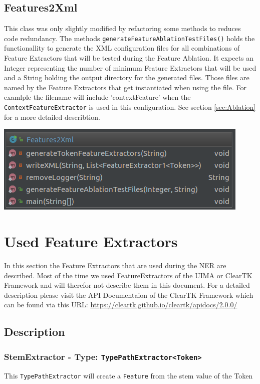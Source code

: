 \documentclass[11pt, english]{article}
\begin{document}
\subsection{Features2Xml}
\label{sec:Features2Xml}
This class was only slightly modified by refactoring some methods to reduces code redundancy. The methods \verb/generateFeatureAblationTestFiles()/ holds the functionallity to generate the XML configuration files for all combinations of Feature Extractors that will be tested during the Feature Ablation. It expects an Integer representing the number of minimum Feature Extractors that will be used and a String holding the output directory for the generated files. Those files are named by the Feature Extractors that get instantiated when using the file. For examlple the filename will include 'contextFeature' when the \verb/ContextFeatureExtractor/ is used in this configuration. See section \ref{sec:Ablation} for a more detailed describtion.

\includegraphics[scale=0.5]{gfx/Features2Xml.png}
\label{fig:Features2Xml}

\section{Used Feature Extractors}
In this section the Feature Extractors that are used during the NER are described. Most of the time we used FeatureExtractors of the UIMA or ClearTK Framework and will therefor not describe them in this document. For a detailed description please visit the API Documentaion of the ClearTK Framework which can be found via this URL: \url{https://cleartk.github.io/cleartk/apidocs/2.0.0/}
\subsection{Description}

\subsubsection*{StemExtractor - Type: \texttt{TypePathExtractor<Token>}}
This \verb/TypePathExtractor/ will create a \verb/Feature/ from the stem value of the Token
\end{document}
